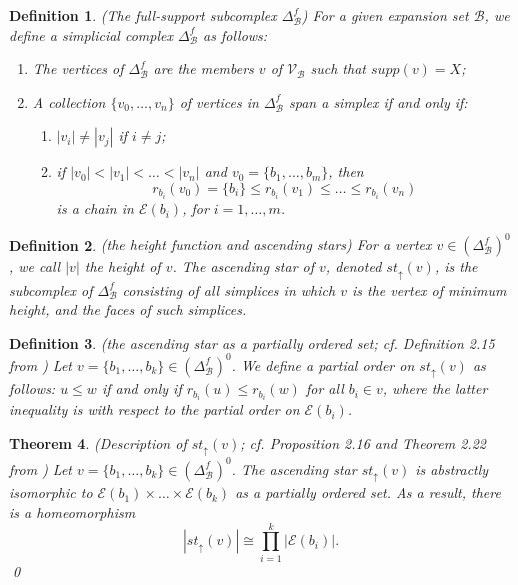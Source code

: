 \documentclass{amsart}
\newtheorem{theorem}{Theorem}[section]
\newtheorem{Definition}[theorem]{Definition}
\newtheorem{standing assumption}[theorem]{Standing Assumption}
\newenvironment{definition}{\begin{Definition}\normalfont}{\end{Definition}}
\begin{document}
\begin{definition} \label{definition:complexes}
(The full-support subcomplex $\Delta^{f}_{\mathcal{B}}$)
For a given expansion set $\mathcal{B}$, we define a simplicial complex
$\Delta^{f}_{\mathcal{B}}$ as follows:
\begin{enumerate}
\item The vertices of $\Delta^{f}_{\mathcal{B}}$ are the members $v$ of 
$\mathcal{V}_{\mathcal{B}}$ such that $supp(v) = X$;
\item A collection $\{ v_{0}, \ldots, v_{n} \}$ of vertices in $\Delta^{f}_{\mathcal{B}}$ 
span a simplex if and only if:
\begin{enumerate}
\item $|v_{i}| \neq |v_{j}|$ if $i \neq j$;
\item if $|v_{0}| < |v_{1}| < \ldots < |v_{n}|$ and $v_{0} = \{ b_{1}, \ldots, b_{m} \}$,
then 
\[ r_{b_{i}}(v_{0}) = \{ b_{i} \} \leq r_{b_{i}}(v_{1}) \leq \ldots \leq r_{b_{i}}(v_{n}) \]
is a chain in $\mathcal{E}(b_{i})$, for $i = 1, \ldots, m$.
\end{enumerate}
\end{enumerate}
\end{definition}

\begin{definition} \label{definition:ascstar}
(the height function and ascending stars)
For a vertex $v \in \left(\Delta^{f}_{\mathcal{B}}\right)^{0}$, we call $|v|$ the \emph{height of $v$}. The \emph{ascending star of $v$}, denoted $st_{\uparrow}(v)$, is the subcomplex of 
$\Delta^{f}_{\mathcal{B}}$ consisting of all simplices in which $v$ is the vertex of minimum height, and 
the faces of such simplices.
\end{definition}

\begin{definition} \label{definition:poset}
(the ascending star as a partially ordered set; cf. Definition 2.15 from \cite{Farley})
Let $v = \{ b_{1}, \ldots, b_{k} \} \in \left( \Delta^{f}_{\mathcal{B}} \right)^{0}$. We define a partial order 
on $st_{\uparrow}(v)$ as follows:
$u \leq w$ if and only if  $r_{b_{i}}(u) \leq r_{b_{i}}(w)$
for all $b_{i} \in v$, where the latter inequality is with respect to the partial order
on $\mathcal{E}(b_{i})$.
\end{definition}

\begin{theorem} \label{theorem:summary}
(Description of $st_{\uparrow}(v)$; cf. Proposition 2.16 and Theorem 2.22 from \cite{Farley})
Let $v = \{ b_{1}, \ldots, b_{k} \} \in \left( \Delta^{f}_{\mathcal{B}} \right)^{0}$. 
The ascending star $st_{\uparrow}(v)$ is abstractly isomorphic to 
$\mathcal{E}(b_{1}) \times \ldots \times \mathcal{E}(b_{k})$ as a partially ordered set. As a result, there is a homeomorphism
\[ |st_{\uparrow}(v)| \cong \prod_{i=1}^{k} |\mathcal{E}(b_{i})|. \] \qed
\end{theorem}
\end{document}

